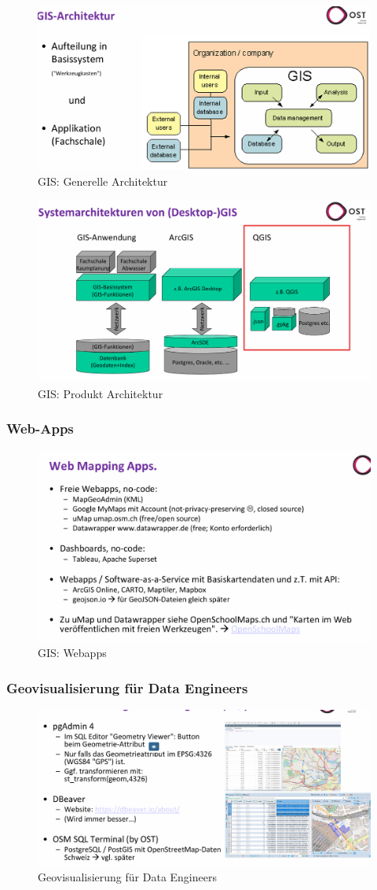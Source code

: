\documentclass[../Main.tex]{subfiles}
\begin{document}
\begin{figure}[H]
    \centering
    \includegraphics[width=0.5\linewidth]{Images/gis-architektur.png}
    \caption{GIS: Generelle Architektur}
\end{figure}
\begin{figure}[H]
    \centering
    \includegraphics[width=0.5\linewidth]{Images/gis-architekturen.png}
    \caption{GIS: Produkt Architektur}
\end{figure}

\subsubsection{Web-Apps}
\begin{figure}[H]
    \centering
    \includegraphics[width=0.75\linewidth]{Images/gis-webapps.png}
    \caption{GIS: Webapps}
\end{figure}

\subsubsection{Geovisualisierung für Data Engineers}
\begin{figure}[H]
    \centering
    \includegraphics[width=0.75\linewidth]{Images/geovisualisierung-data-eng.png}
    \caption{Geovisualisierung für Data Engineers}
\end{figure}
\end{document}
